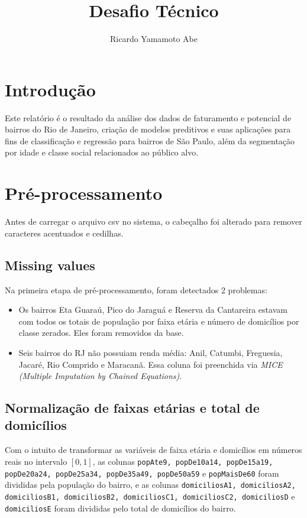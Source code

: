\documentclass[10pt, a4paper]{article}
\begin{document}
\title{Desafio Técnico}

\author{Ricardo Yamamoto Abe}

\maketitle

\section{Introdução}

Este relatório é o resultado da análise dos dados de faturamento e
potencial de bairros do Rio de Janeiro, criação de modelos preditivos
e suas aplicações para fins de classificação e regressão para bairros
de São Paulo, além da segmentação por idade e classe social
relacionados ao público alvo.

\section{Pré-processamento}

Antes de carregar o arquivo csv no sistema, o cabeçalho foi alterado
para remover caracteres acentuados e cedilhas.

\subsection{Missing values}

Na primeira etapa de pré-processamento, foram detectados 2 problemas:

\begin{itemize}
\item Os bairros Eta Guaraú, Pico do Jaraguá e Reserva da Cantareira
  estavam com todos os totais de população por faixa etária e número
  de domicílios por classe zerados. Eles foram removidos da base.
\item Seis bairros do RJ não possuiam renda média: Anil, Catumbi,
  Freguesia, Jacaré, Rio Comprido e Maracanã. Essa coluna foi
  preenchida via \emph{MICE (Multiple Imputation by Chained
    Equations)}.
\end{itemize}

\subsection{Normalização de faixas etárias e total de domicílios}

Com o intuito de transformar as variáveis de faixa etária e domicílios
em números reais no intervalo $[0, 1]$, as colunas \texttt{popAte9,
  popDe10a14, popDe15a19, popDe20a24, popDe25a34, popDe35a49,
  popDe50a59} e \texttt{popMaisDe60} foram divididas pela população do
bairro, e as colunas \texttt{domiciliosA1, domiciliosA2, domiciliosB1,
  domiciliosB2, domiciliosC1, domiciliosC2, domiciliosD} e
\texttt{domiciliosE} foram divididas pelo total de domicílios do
bairro.
\end{document}

